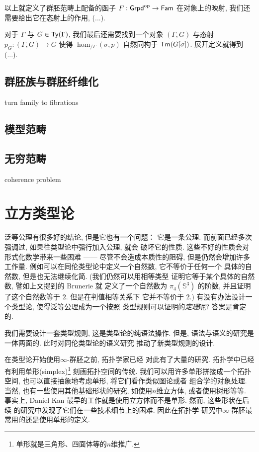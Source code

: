 以上就定义了群胚范畴上配备的函子 \(F : \textnormal{\textsf{Grpd}}^\mathrm{op} \to \textnormal{\textsf{Fam}}\)
在对象上的映射, 我们还需要给出它在态射上的作用, (...).


对于 \(\Gamma\) 与 \(G \in \textnormal{\textsf{Ty}}(\Gamma)\),
我们最后还需要找到一个对象 \((\Gamma, G)\) 与态射
\(p_G : (\Gamma,G) \to G\) 使得
\(\hom_{/\Gamma}(\sigma, p)\) 自然同构于
\(\textnormal{\textsf{Tm}}(G[\sigma])\). 展开定义就得到 (...).

\subsection{群胚族与群胚纤维化}

turn family to fibrations

\subsection[模型范畴]{模型范畴\protect\berryinf}

\subsection{无穷范畴}

coherence problem

\section{立方类型论}

泛等公理有很多好的结论, 但是它也有一个问题： 它是一条公理.
而前面已经多次强调过, 如果往类型论中强行加入公理, 就会
破坏它的性质. 这些不好的性质会对形式化数学带来一些困难
------ 尽管不会造成本质性的阻碍, 但是仍然会增加许多工作量.
例如可以在同伦类型论中定义一个自然数, 它不等价于任何一个
具体的自然数, 但是也无法继续化简. (我们仍然可以用相等类型
证明它等于某个具体的自然数, 譬如上文提到的 Brunerie 就
定义了一个自然数为 \(\pi_4(\mathbb S^3)\) 的阶数,
并且证明了这个自然数等于 \(2\). 但是在判值相等关系下
它并不等价于 2.)
有没有办法设计一个类型论, 使得泛等公理成为一个按照
类型规则可以证明的\emph{定理}呢? 答案是肯定的.

我们需要设计一套类型规则, 这是类型论的纯语法操作. 但是,
语法与语义的研究是一体两面的. 此时对同伦类型论的语义研究
推动了新类型规则的设计.

在类型论开始使用\(\infty\)-群胚之前, 拓扑学家已经
对此有了大量的研究. 拓扑学中已经有利用单形(simplex)\footnote{单形就是三角形、四面体等的\(n\)维推广.}
刻画拓扑空间的传统. 我们可以用许多单形拼接成一个拓扑空间,
也可以直接抽象地考虑单形, 将它们看作类似图论或者
组合学的对象处理. 当然, 也有一些使用其他基础形状的研究,
如使用\(n\)维立方体, 或者使用树形等等. 事实上, Daniel Kan
最早的工作就是使用立方体而不是单形. 然而, 这些形状在后续
的研究中发现了它们在一些技术细节上的困难. 因此在拓扑学
研究中\(\infty\)-群胚最常用的还是使用单形的定义.

